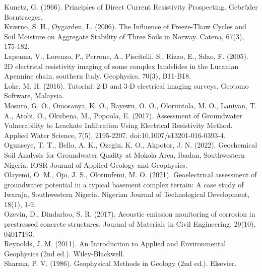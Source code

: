 \documentclass[12pt,a4paper]{report}
\begin{document}
\begin{justify}
    Kunetz, G. (1966). Principles of Direct Current Resistivity Prospecting. Gebrüder Borntraeger. \\
    
    Kværno, S. H., Øygarden, L. (2006). The Influence of Freeze-Thaw Cycles and Soil Moisture on Aggregate Stability of Three Soils in Norway. Catena, 67(3), 175-182. \\
    
    Lapenna, V., Lorenzo, P., Perrone, A., Piscitelli, S., Rizzo, E., Sdao, F. (2005). 2D electrical resistivity imaging of some complex landslides in the Lucanian Apennine chain, southern Italy. Geophysics, 70(3), B11-B18. \\
    
    Loke, M. H. (2016). Tutorial: 2-D and 3-D electrical imaging surveys. Geotomo Software, Malaysia. \\
    
    Mosuro, G. O., Omosanya, K. O., Bayewu, O. O., Oloruntola, M. O., Laniyan, T. A., Atobi, O., Okubena, M., Popoola, E. (2017). Assessment of Groundwater Vulnerability to Leachate Infiltration Using Electrical Resistivity Method. Applied Water Science, 7(5), 2195-2207. doi:10.1007/s13201-016-0393-4. \\
    
    Ogunseye, T. T., Bello, A. K., Ozegin, K. O., Akpotor, J. N. (2022). Geochemical Soil Analysis for Groundwater Quality at Mokola Area, Ibadan, Southwestern Nigeria. IOSR Journal of Applied Geology and Geophysics. \\
    
    Olayemi, O. M., Ojo, J. S., Olorunfemi, M. O. (2021). Geoelectrical assessment of groundwater potential in a typical basement complex terrain: A case study of Iwaraja, Southwestern Nigeria. Nigerian Journal of Technological Development, 18(1), 1-9. \\
    
    Ozevin, D., Dindarloo, S. R. (2017). Acoustic emission monitoring of corrosion in prestressed concrete structures. Journal of Materials in Civil Engineering, 29(10), 04017193. \\
    
    Reynolds, J. M. (2011). An Introduction to Applied and Environmental Geophysics (2nd ed.). Wiley-Blackwell. \\
    
    Sharma, P. V. (1986). Geophysical Methods in Geology (2nd ed.). Elsevier. \\
    

\end{justify}
\end{document}
